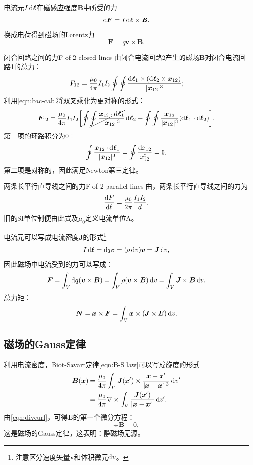 电流元$I\mathop{}\!\mathrm{d}\bm\ell$在磁感应强度$\bm B$中所受的力
\[
    \mathop{}\!\mathrm{d}\bm F=I\mathop{}\!\mathrm{d}\bm\ell\times\bm B.
\]
换成电荷得到磁场的Lorentz力
\begin{equation}
    \bm F=q\bm v\times\bm B.
\end{equation}
\begin{example}{闭合回路之间的力}{F of 2 closed lines}
    由闭合电流回路2产生的磁场$\bm B$对闭合电流回路1的总力：
    \[
        \bm F_{12}=\frac{\mu_0}{4\pi}I_1I_2\oint\oint\frac{\mathop{}\!\mathrm{d}\bm\ell_1\times(\mathop{}\!\mathrm{d}\bm\ell_2\times\bm x_{12})}{|\bm x_{12}|^3};
    \]
    利用\eqref{eqn:bac-cab}将双叉乘化为更对称的形式：
    \[
        \bm F_{12}=\frac{\mu_0}{4\pi}I_1I_2\biggl[\oint\cancel{\oint\frac{\bm x_{12}\cdot\mathop{}\!\mathrm{d}\bm\ell_1}{|\bm x_{12}|^3}}\mathop{}\!\mathrm{d}\bm\ell_2-\oint\oint\frac{\bm x_{12}}{|\bm x_{12}|^3}(\mathop{}\!\mathrm{d}\bm\ell_1\cdot\mathop{}\!\mathrm{d}\bm\ell_2)\biggr].
    \]
    第一项的环路积分为0：
    \[
        \oint\frac{\bm x_{12}\cdot\mathop{}\!\mathrm{d}\bm\ell_1}{|\bm x_{12}|^3}=\oint\frac{\mathop{}\!\mathrm{d} x_{12}}{x_{12}^2}=0.
    \]
    第二项是对称的，因此满足Newton第三定律。
\end{example}
\begin{example}{两条长平行直导线之间的力}{F of 2 parallel lines}
    由，两条长平行直导线之间的力为
    \begin{equation}
        \frac{\mathrm{d}^{{}}F}{\mathrm{d}{\ell}^{{}}}=\frac{\mu_0}{2\pi}\frac{I_1I_2}d.
    \end{equation}
    旧的SI单位制便由此式及$\mu_0$定义电流单位A。
\end{example}
电流元可以写成电流密度$\bm J$的形式\footnote{注意区分速度矢量$\bm v$和体积微元$\mathop{}\!\mathrm{d} v$。}
\[
    I\mathop{}\!\mathrm{d}\bm\ell=\mathop{}\!\mathrm{d} q\bm v=(\rho\mathop{}\!\mathrm{d} v)\bm v=\bm J\mathop{}\!\mathrm{d} v,
\]
因此磁场中电流受到的力可以写成：
\[
    \bm F=\int_V\mathop{}\!\mathrm{d} q(\bm v\times\bm B)=\int_V\rho(\bm v\times\bm B)\mathop{}\!\mathrm{d} v=\int_V\bm J\times\bm B\mathop{}\!\mathrm{d} v.
\]
总力矩：
\[
    \bm N=\bm x\times\bm F=\int_V\bm x\times(\bm J\times\bm B)\mathop{}\!\mathrm{d} v.
\]

\subsection{磁场的Gauss定律}

利用电流密度，Biot-Savart定律\eqref{eqn:B-S law}可以写成旋度的形式
\begin{align}
    \label{eqn:B(x)}
    \bm B(\bm x)&=\frac{\mu_0}{4\pi}\int_V\bm J(\bm x')\times\frac{\bm x-\bm x'}{|\bm x-\bm x'|^3}\mathop{}\!\mathrm{d} v'\\
    &=\frac{\mu_0}{4\pi}\nabla\times\int_V\frac{\bm J(\bm x')}{|\bm x-\bm x'|}\mathop{}\!\mathrm{d} v'.
\end{align}
由\eqref{eqn:divcurl}，可得$\bm B$的第一个微分方程：
\begin{equation}
    \label{eqn:divB}
    \div\bm B=0,
\end{equation}
这是磁场的Gauss定律，这表明：静磁场无源。

